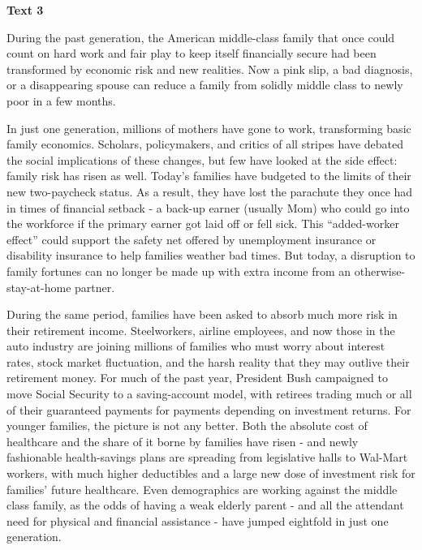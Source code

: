 
\begin{center}\textbf{Text 3}\end{center}

\qquad During the past generation, the American middle-class family that once could count on hard work and fair play to keep itself financially secure had been transformed by economic risk and new realities. Now a pink slip, a bad diagnosis, or a disappearing spouse can reduce a family from solidly middle class to newly poor in a few months.

\qquad In just one generation, millions of mothers have gone to work, transforming basic family economics. Scholars, policymakers, and critics of all stripes have debated the social implications of these changes, but few have looked at the side effect: family risk has risen as well. Today's families have budgeted to the limits of their new two-paycheck status. As a result, they have lost the parachute they once had in times of financial setback - a back-up earner (usually Mom) who could go into the workforce if the primary earner got laid off or fell sick. This ``added-worker effect'' could support the safety net offered by unemployment insurance or disability insurance to help families weather bad times. But today, a disruption to family fortunes can no longer be made up with extra income from an otherwise-stay-at-home partner.

\qquad During the same period, families have been asked to absorb much more risk in their retirement income. Steelworkers, airline employees, and now those in the auto industry are joining millions of families who must worry about interest rates, stock market fluctuation, and the harsh reality that they may outlive their retirement money. For much of the past year, President Bush campaigned to move Social Security to a saving-account model, with retirees trading much or all of their guaranteed payments for payments depending on investment returns. For younger families, the picture is not any better. Both the absolute cost of healthcare and the share of it borne by families have risen - and newly fashionable health-savings plans are spreading from legislative halls to Wal-Mart workers, with much higher deductibles and a large new dose of investment risk for families' future healthcare. Even demographics are working against the middle class family, as the odds of having a weak elderly parent - and all the attendant need for physical and financial assistance - have jumped eightfold in just one generation.

